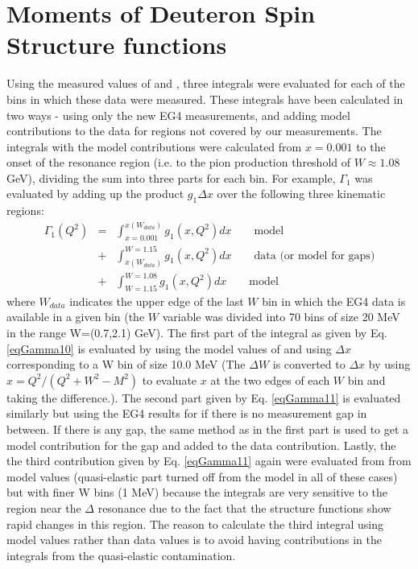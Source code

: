 \section{Moments of Deuteron Spin Structure functions}
Using the measured values of \gones and \afone, three integrals were evaluated for each of the \qsqs bins in which these data were measured. These integrals have been calculated in two ways - using only the new EG4 measurements, and adding model contributions to the data %
for regions not covered by our measurements. %
The integrals with the model contributions were calculated from $x=0.001$ to the onset of the resonance region (i.e. to the pion production threshold of $W\approx 1.08 $ GeV), dividing the sum into three parts for each \qsqs bin. For example, $\Gamma_1$ was evaluated by adding up the product $g_1 \Delta x$ over the following three kinematic regions:
\begin{eqnarray}
\label{eqGamma10}
\Gamma_1(Q^2) &=& \int^{x(W_{data})}_{x=0.001}  g_1(x,Q^2) dx \qquad \text{model} \\ %
\label{eqGamma11}
              &+& \int_{x(W_{data})}^{W=1.15}   g_1(x,Q^2) dx \qquad \text{data (or model for gaps)} \\%
\label{eqGamma12}
              &+& \int^{W=1.08}_{W=1.15}        g_1(x,Q^2) dx \qquad \text{model} %
\end{eqnarray}
where $W_{data}$ indicates the upper edge of the last $W$ bin in which the EG4 data is available in a given \qsqs bin (the $W$ variable was divided into 70 bins of size 20 MeV in the range W=(0.7,2.1) GeV). The first part of the integral as given by Eq. \ref{eqGamma10} is evaluated by using the model values of \gones and using $\Delta x$ corresponding to a W bin of size 10.0 MeV (The $\Delta W$ is converted to $\Delta x$ by using $x = Q^2/(Q^2 + W^2 - M^2)$ to evaluate $x$ at the two edges of each $W$ bin and taking the difference.). The second part given by Eq. \ref{eqGamma11} is evaluated similarly but using the EG4 results for \gones if there is no measurement gap in between. If there is any gap, the same method as in the first part is used to get a model contribution for the gap and added to the data contribution. Lastly, the the third contribution given by Eq. \ref{eqGamma11} again were evaluated from from model values (quasi-elastic part turned off from the model in all of these cases) but with finer W bins (1 MeV) because the integrals are very sensitive to the region near the $\Delta$ resonance due to the fact that the structure functions show rapid changes in this region. The reason to calculate the third integral using model values rather than data values is to avoid having contributions in the integrals from the quasi-elastic contamination.

